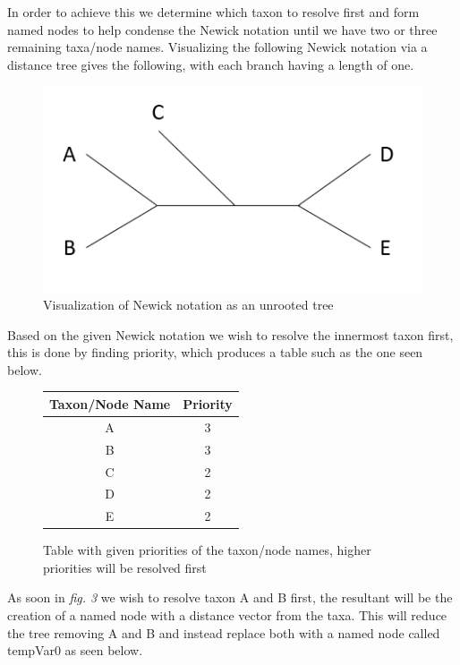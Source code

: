 \documentclass{article}
\begin{document}
In order to achieve this we determine which taxon to resolve first and form named nodes to help condense the Newick notation until we have two or three remaining taxa/node names. Visualizing the following Newick notation via a distance tree gives the following, with each branch having a length of one. \newline
\begin{figure}[!ht]
\includegraphics{firstTree.PNG}
\caption{Visualization of Newick notation as an unrooted tree}
\end{figure}
Based on the given Newick notation we wish to resolve the innermost taxon first, this is done by finding priority, which produces a table such as the one seen below.

\begin{figure}[!ht]
	\begin{center}
	\begin{tabular}{ |c|c| } 
		\hline
		Taxon/Node Name & Priority  \\
		\hline
		 A & 3 \\ 
		 \hline
		 B & 3 \\ 
		 \hline
		 C & 2 \\
		 \hline 
		 D & 2 \\
		 \hline 
		 E & 2 \\ 
		\hline
	\end{tabular}

	\end{center}
		\caption{Table with given priorities of the taxon/node names, higher priorities will be resolved first}
\end{figure}
As soon in \textit{fig. 3} we wish to resolve taxon A and B first, the resultant will be the creation of a named node with a distance vector from the taxa. This will reduce the tree removing A and B and instead replace both with a named node called tempVar0 as seen below. \newline
\end{document}
